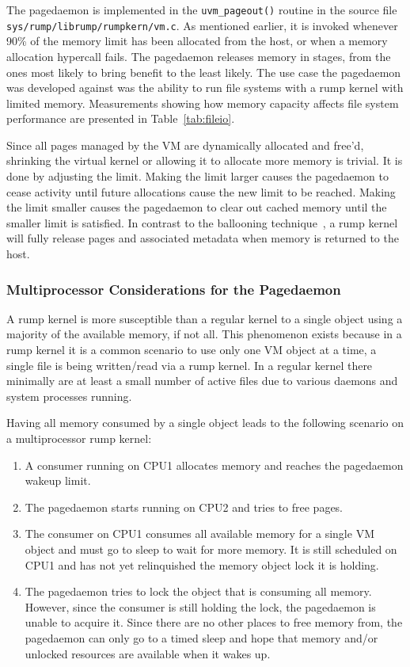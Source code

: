The pagedaemon is implemented in the \verb+uvm_pageout()+ routine
in the source file \texttt{sys/rump/librump/rumpkern/vm.c}.
As mentioned earlier, it is invoked whenever 90\% of the memory
limit has been allocated from the host, or when a memory allocation
hypercall fails.  The pagedaemon releases memory in stages, from
the ones most likely to bring benefit to the least likely.  The
use case the pagedaemon was developed against was the ability to
run file systems with a rump kernel with limited memory.  Measurements
showing how memory capacity affects file system performance are
presented in Table~\ref{tab:fileio}.

Since all pages managed by the VM are dynamically allocated and
free'd, shrinking the virtual kernel or allowing it to allocate
more memory is trivial.  It is done by adjusting the limit.  Making
the limit larger causes the pagedaemon to cease activity until
future allocations cause the new limit to be reached.  Making the
limit smaller causes the pagedaemon to clear out cached memory
until the smaller limit is satisfied.  In contrast to the ballooning
technique~\cite{waldspurger:ballooning}, a rump kernel will fully
release pages and associated metadata when memory is returned to
the host.

\subsubsection*{Multiprocessor Considerations for the Pagedaemon}

A rump kernel is more susceptible than a regular kernel to a single
object using a majority of the available memory, if not all.  This
phenomenon exists because in a rump kernel it is a common scenario to
use only one VM object at a time, \eg a single file is being written/read
via a rump kernel.  In a regular kernel there minimally are at least a
small number of active files due to various daemons and system processes
running.

Having all memory consumed by a single object leads to the following
scenario on a multiprocessor rump kernel:

\begin{enumerate}
\item   A consumer running on CPU1 allocates memory and reaches
	the pagedaemon wakeup limit.
\item	The pagedaemon starts running on CPU2 and tries to free pages.
\item   The consumer on CPU1 consumes all available memory for a
	single VM object and must go to sleep to wait for more
	memory.  It is still scheduled on CPU1 and has not yet
	relinquished the memory object lock it is holding.
\item   The pagedaemon tries to lock the object that is consuming all
	memory.  However, since the consumer is still holding the
	lock, the pagedaemon is unable to acquire it.  Since there
	are no other places to free memory from, the pagedaemon
	can only go to a timed sleep and hope that memory and/or
	unlocked resources are available when it wakes up.
\end{enumerate}


